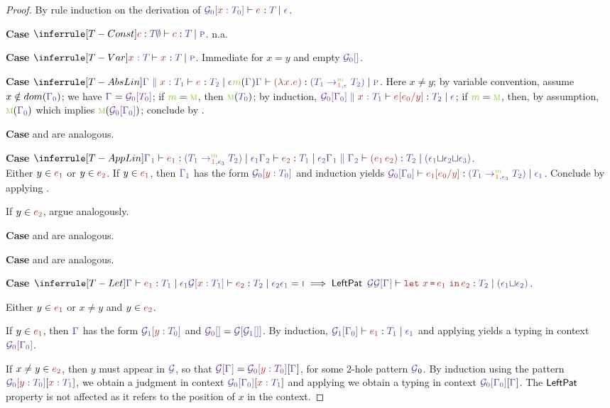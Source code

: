 \documentclass{article}
\begin{document}
\begin{proof}
  By rule induction on the derivation of  $\HasType
  {\CtxPattern[0]{\CtxVar x{\T[0]}}} {\E} {\T} {\Eff}$.

  \textbf{Case} $\RuleTConst$. n.a.

  \textbf{Case} $\RuleTVar$. Immediate for $x=y$ and empty $\CtxPattern[0]{}$.

  \textbf{Case} $\RuleTAbsLin$. Here $x\ne y$; by variable convention, assume
  $x \notin dom (\Ctx[0])$;
  we have $\Ctx = \CtxPattern[0]{{\T[0]}}$;
  if $\Mob = \MobMobile$, then $\MobMobile (\T[0])$;
  by induction,
  $\HasType
  {\CtxExtUnord{\CtxPattern[0]{{\Ctx[0]}}}{\CtxVar\EVar{\T[1]}}}
  {\Subs\E{\E[0]} y} {\T[2]} {\Eff}$;   if $\Mob = \MobMobile$, then, by assumption, $\MobMobile
  (\Ctx[0])$ which implies $\MobMobile (\CtxPattern[0]{{\Ctx[0]}})$; conclude
  by .

  \textbf{Case}  and  are
  analogous.

  \textbf{Case} $\RuleTAppLin$. \\
  Either $y\in \E[1]$ or $y \in \E[2]$.
  If $y\in \E[1]$, then $\Ctx[1]$ has the form $\CtxPattern[0]{\CtxVar y
    {\T[0]}}$ and induction yields
  $\HasType {\CtxPattern[0]{\Ctx[0]}} {\Subs{\E[1]}{\E[0]}y}
  {(\TArr{\Mob}{\DirUnord,{\Eff[3]}}{\T[1]}{\T[2]})}
  {\Eff[1]}$. Conclude by applying . 

  If $y\in \E[2]$, argue analogously.

  \textbf{Case}  and  are
  analogous.

  \textbf{Case}  and  are analogous.

  \textbf{Case} $\RuleTLet$.

  Either $y\in\E[1]$ or $x\ne y$ and $y\in\E[2]$.

  If $y\in\E[1]$, then $\Ctx$ has the form $\CtxPattern[1]{\CtxVar y
    {\T[0]}}$ and $\CtxPattern[0]{} = \CtxPattern{\CtxPattern[1]{}}$.
  By induction, $\HasType {\CtxPattern[1]{\Ctx[0]}} {\E[1]} {\T[1]}
  {\Eff[1]}$ and applying  yields a typing in context
  $\CtxPattern[0]{\Ctx[0]}$.

  If $x \ne y \in \E[2]$, then $y$ must appear in $\CtxPatternRaw$, so
  that $\CtxPattern{\Ctx} = \CtxPattern[0]{\CtxVar y {\T[0]}}[{\Ctx}]$, for
  some 2-hole pattern $\CtxPatternRaw_0$. By induction using the
  pattern $\CtxPattern[0]{\CtxVar y {\T[0]}}[{\CtxVar x {\T[1]}}]$, we
  obtain a judgment in context $\CtxPattern[0]{\Ctx[0]}[{\CtxVar x {\T[1]}}]$
 and applying 
  we obtain a typing in context $\CtxPattern[0]{\Ctx[0]}[{\Ctx}]$. The
  $\operatorname{\textsf{LeftPat}}$ property is not affected as it refers to the position
  of $x$ in the context.


\end{proof}
\end{document}
